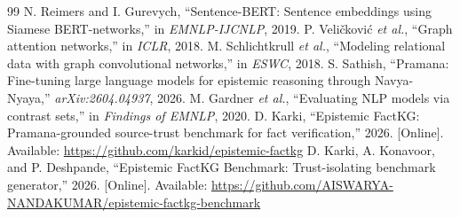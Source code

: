 \documentclass[conference]{IEEEtran}
\begin{document}
\begin{thebibliography}{99}
 N. Reimers and I. Gurevych, ``Sentence-BERT: Sentence embeddings using Siamese BERT-networks,'' in \textit{EMNLP-IJCNLP}, 2019.
 P. Veli\v{c}kovi\'{c} \textit{et al.}, ``Graph attention networks,'' in \textit{ICLR}, 2018.
 M. Schlichtkrull \textit{et al.}, ``Modeling relational data with graph convolutional networks,'' in \textit{ESWC}, 2018.
 S. Sathish, ``Pramana: Fine-tuning large language models for epistemic reasoning through Navya-Nyaya,'' \textit{arXiv:2604.04937}, 2026.
 M. Gardner \textit{et al.}, ``Evaluating NLP models via contrast sets,'' in \textit{Findings of EMNLP}, 2020.
 D. Karki, ``Epistemic FactKG: Pramana-grounded source-trust benchmark for fact verification,'' 2026. [Online]. Available: \url{https://github.com/karkid/epistemic-factkg}
 D. Karki, A. Konavoor, and P. Deshpande, ``Epistemic FactKG Benchmark: Trust-isolating benchmark generator,'' 2026. [Online]. Available: \url{https://github.com/AISWARYA-NANDAKUMAR/epistemic-factkg-benchmark}
\end{thebibliography}
\end{document}
